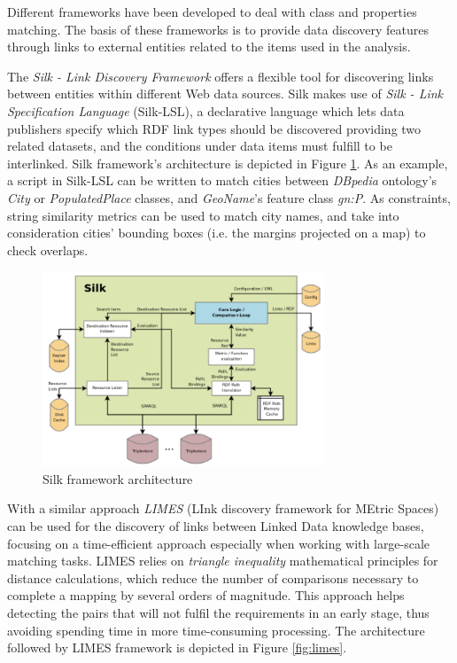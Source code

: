 Different frameworks have been developed to deal with class and properties matching. The basis of these frameworks is to provide data discovery features through links to external entities related to the items used in the analysis.

The \textit{Silk - Link Discovery Framework} \cite{volz2009silk} offers a flexible tool for discovering links between entities within different Web data sources. Silk makes use of \textit{Silk - Link Specification Language} (Silk-LSL), a declarative language which lets data publishers specify which RDF link types should be discovered providing two related datasets, and the conditions under data items must fulfill to be interlinked. Silk framework's architecture is depicted in Figure \ref{fig:silk}. As an example, a script in Silk-LSL can be written to match cities between \textit{DBpedia} ontology's \textit{City} or \textit{PopulatedPlace} classes, and \textit{GeoName}'s feature class \textit{gn:P}. As constraints, string similarity metrics can be used to match city names, and take into consideration cities' bounding boxes (i.e. the margins projected on a map) to check overlaps.

\begin{figure}
    \center
    \includegraphics[width=0.75\textwidth]{img/ld_approach/silk.png}
    \caption{Silk framework architecture}
    \label{fig:silk}
\end{figure}

With a similar approach \textit{LIMES} (LInk discovery framework for MEtric Spaces) \cite{ngomo2011limes} can be used for the discovery of links between Linked Data knowledge bases, focusing on a time-efficient approach especially when working with large-scale matching tasks. LIMES relies on \textit{triangle inequality} mathematical principles for distance calculations, which reduce the number of comparisons necessary to complete a mapping by several orders of magnitude. This approach helps detecting the pairs that will not fulfil the requirements in an early stage, thus avoiding spending time in more time-consuming processing. The architecture followed by LIMES framework is depicted in Figure \ref{fig:limes}.

